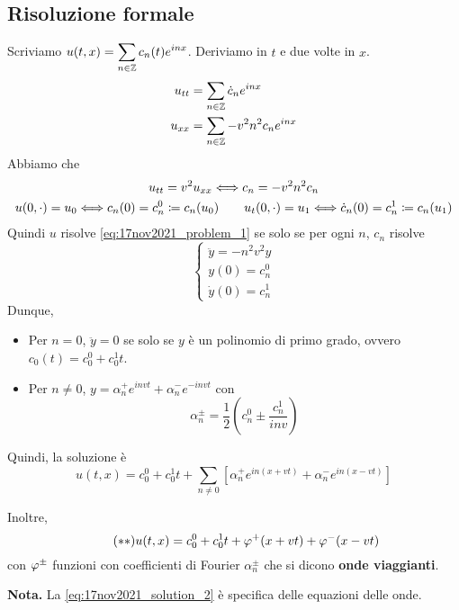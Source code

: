 \subsection{Risoluzione formale}

Scriviamo $\displaystyle u(t,x) = \sum_{n \in \mathbb Z} c_n(t) e^{inx}$. Deriviamo in $t$ e due volte in $x$.
\begin{align*}
	u_{tt} & = \sum_{n \in \mathbb Z} \dot c_n e^{inx} \\
	u_{xx} & = \sum_{n \in \mathbb Z} - v^2 n^2 c_n e^{inx}
\end{align*}
Abbiamo che
\begin{gather*}
	u_{tt} = v^2 u_{xx} \Longleftrightarrow c_n = -v^2 n^2 c_n \\
	u(0, \cdot) = u_0 \Longleftrightarrow c_n(0) = c_n^0 \coloneqq c_n(u_0)
	\qquad
	u_t(0, \cdot) = u_1 \Longleftrightarrow \dot c_n(0) = c_n^1 \coloneqq c_n(u_1)
\end{gather*}
Quindi $u$ risolve \eqref{eq:17nov2021_problem_1} se solo se per ogni $n$, $c_n$ risolve
%
\begin{equation}
\tag{P$'$} \label{eq:17nov2021_problem_2}
\begin{cases}
	\ddot y = -n^2 v^2 y \\
	y(0) = c_n^0 \\
	\dot y(0) = c_n^1
\end{cases} 
\end{equation}
%
Dunque,
\begin{itemize}

	\item Per $n = 0$, $\ddot y = 0$ se solo se $y$ è un polinomio di primo grado, ovvero $c_0(t) = c_0^0 + c_0^1 t$.


	\item Per $n \neq 0$, $y = \alpha_{n}^+ e^{invt} + \alpha_n^- e^{-invt} $ con 
	$$
		\alpha_n^{\pm} = \frac{1}{2} \left( c_n^0 \pm \frac{c_n^1}{inv} \right)
	$$                                 

\end{itemize}
%
Quindi, la soluzione è
\begin{equation}
 \tag{$\ast$} \label{eq:17nov2021_solution_1}
	u(t,x) = c_0^0 + c_0^1 t + \sum_{n\neq 0} \left[ \alpha_n^+ e^{in(x + vt)} + \alpha_n^- e^{in(x - vt)} \right]
\end{equation}

Inoltre,
\begin{equation}
\tag{$\ast \ast$} \label{eq:17nov2021_solution_2}
	u(t,x) = c_0^0 + c_0^1 t + \varphi^+(x + vt) + \varphi^-(x - vt)
\end{equation}
con $\varphi^{\pm}$ funzioni con coefficienti di Fourier $\alpha_n^{\pm}$ che si dicono \textbf{onde viaggianti}.

\textbf{Nota.} La \eqref{eq:17nov2021_solution_2} è specifica delle equazioni delle onde.
